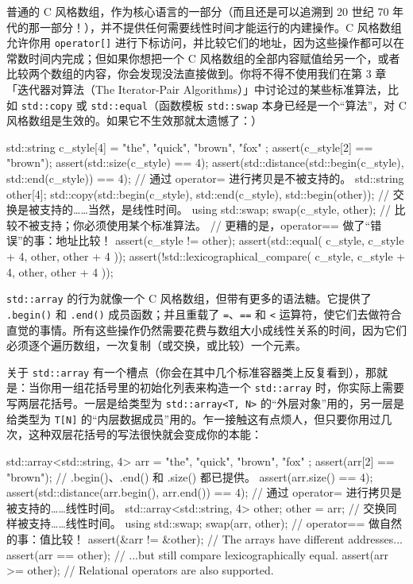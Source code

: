 普通的 C 风格数组，作为核心语言的一部分（而且还是可以追溯到 20 世纪 70 年代的那一部分！），并不提供任何需要线性时间才能运行的内建操作。C 风格数组允许你用 \texttt{operator[]} 进行下标访问，并比较它们的地址，因为这些操作都可以在常数时间内完成；但如果你想把一个 C 风格数组的全部内容赋值给另一个，或者比较两个数组的内容，你会发现没法直接做到。你将不得不使用我们在第 3 章「迭代器对算法（The Iterator-Pair Algorithms）」中讨论过的某些标准算法，比如 \texttt{std::\allowbreak{}copy} 或 \texttt{std::\allowbreak{}equal}（函数模板 \texttt{std::\allowbreak{}swap} 本身已经是一个“算法”，对 C 风格数组是生效的。如果它不生效那就太遗憾了：）

\begin{codebox}[cpp]
    std::string c_style[4] = {
      "the", "quick", "brown", "fox"
    };
    assert(c_style[2] == "brown");
    assert(std::size(c_style) == 4);
    assert(std::distance(std::begin(c_style), std::end(c_style)) == 4);
    // 通过 operator= 进行拷贝是不被支持的。
    std::string other[4];
    std::copy(std::begin(c_style), std::end(c_style), std::begin(other));
    // 交换是被支持的……当然，是线性时间。
    using std::swap;
    swap(c_style, other);
    // 比较不被支持；你必须使用某个标准算法。
    // 更糟的是，operator== 做了“错误”的事：地址比较！
    assert(c_style != other);
    assert(std::equal(
      c_style, c_style + 4,
      other, other + 4
    ));
    assert(!std::lexicographical_compare(
      c_style, c_style + 4,
      other, other + 4
    ));
\end{codebox}

\texttt{std::\allowbreak{}array} 的行为就像一个 C 风格数组，但带有更多的语法糖。它提供了 \texttt{.begin(\allowbreak{})\allowbreak{}} 和 \texttt{.end(\allowbreak{})\allowbreak{}} 成员函数；并且重载了 \texttt{=}、\texttt{==} 和 \texttt{<} 运算符，使它们去做符合直觉的事情。所有这些操作仍然需要花费与数组大小成线性关系的时间，因为它们必须逐个遍历数组，一次复制（或交换，或比较）一个元素。

关于 \texttt{std::\allowbreak{}array} 有一个槽点（你会在其中几个标准容器类上反复看到），那就是：当你用一组花括号里的初始化列表来构造一个 \texttt{std::\allowbreak{}array} 时，你实际上需要写两层花括号。一层是给类型为 \texttt{std::\allowbreak{}array<\allowbreak{}T,\allowbreak{} N>\allowbreak{}} 的“外层对象”用的，另一层是给类型为 \texttt{T[N]} 的“内层数据成员”用的。乍一接触这有点烦人，但只要你用过几次，这种双层花括号的写法很快就会变成你的本能：

\begin{codebox}[cpp]
    std::array<std::string, 4> arr = {{
      "the", "quick", "brown", "fox"
    }};
    assert(arr[2] == "brown");
    // .begin()、.end() 和 .size() 都已提供。
    assert(arr.size() == 4);
    assert(std::distance(arr.begin(), arr.end()) == 4);
    // 通过 operator= 进行拷贝是被支持的……线性时间。
    std::array<std::string, 4> other;
    other = arr;
    // 交换同样被支持……线性时间。
    using std::swap;
    swap(arr, other);
    // operator== 做自然的事：值比较！
    assert(&arr != &other); // The arrays have different addresses...
    assert(arr == other); // ...but still compare lexicographically equal.
    assert(arr >= other); // Relational operators are also supported.
\end{codebox}

